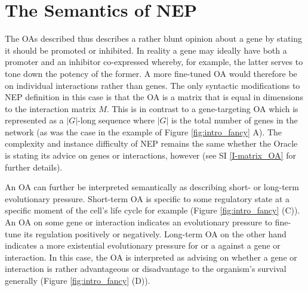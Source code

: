 \section{The Semantics of NEP}\label{sup_semantics}
      The OAs described thus describes a rather blunt opinion about a gene by stating it should be promoted or inhibited. In reality a gene may ideally have both a promoter and an inhibitor co-expressed whereby, for example, the latter serves to tone down the potency of the former. A more fine-tuned OA would therefore be on individual interactions rather than genes. The only syntactic modifications to NEP definition in this case is that the OA is a matrix that is equal in dimensions to the interaction matrix $M$. This is in contrast to a gene-targeting OA which is represented as a $|G|$-long sequence where $|G|$ is the total number of genes in the network (as was the case in the example of Figure \ref{fig:intro_fancy} A). The complexity and instance difficulty of NEP remains the same whether the Oracle is stating its advice on genes or interactions, however (see SI \ref{I-matrix_OA} for further details).
      

			An OA can further be interpreted semantically as describing short- or long-term evolutionary pressure. Short-term OA is specific to some regulatory state at a specific moment of the cell's life cycle for example (Figure \ref{fig:intro_fancy} (C)). An OA on some gene or interaction indicates an evolutionary pressure to fine-tune its regulation positively or negatively. Long-term OA on the other hand indicates a more existential evolutionary pressure for or a against a gene or interaction. In this case, the OA is interpreted as advising on whether a gene or interaction is rather advantageous or disadvantage to the organism's survival generally (Figure \ref{fig:intro_fancy} (D)).
